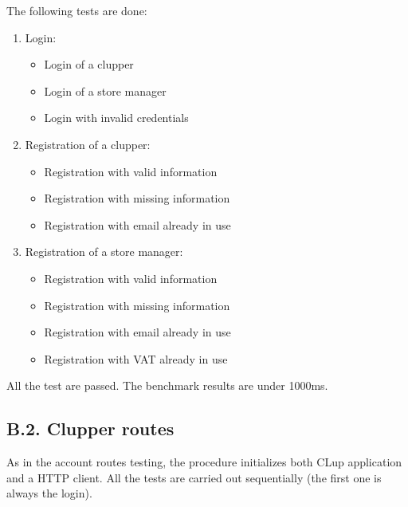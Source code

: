 The following tests are done:
\begin{enumerate}
    \item Login:
        \begin{itemize}
            \item Login of a clupper
            \item Login of a store manager
            \item Login with invalid credentials
        \end{itemize}
    \item Registration of a clupper:
        \begin{itemize}
            \item Registration with valid information
            \item Registration with missing information
            \item Registration with email already in use
        \end{itemize}
    \item Registration of a store manager:
        \begin{itemize}
            \item Registration with valid information
            \item Registration with missing information
            \item Registration with email already in use
            \item Registration with VAT already in use
        \end{itemize}
\end{enumerate}

All the test are passed. The benchmark results are under 1000ms.

\subsection{B.2. Clupper routes}

As in the account routes testing, the procedure initializes both CLup application and a HTTP client.
All the tests are carried out sequentially (the first one is always the login).


